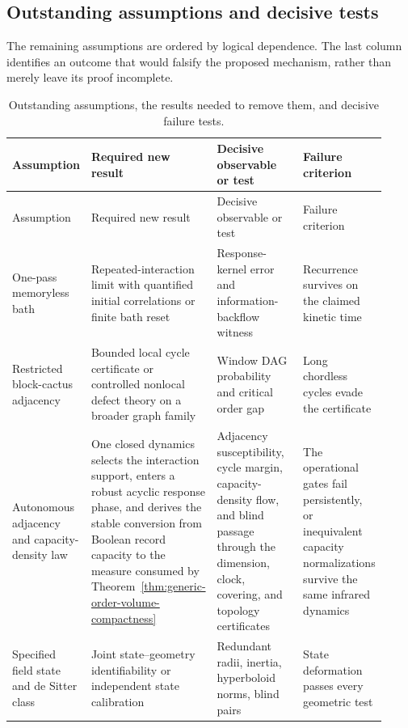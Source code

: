 \begin{landscape}
\section{Outstanding assumptions and decisive tests}
\label{sec:updated-ledger}

The remaining assumptions are ordered by logical dependence.  The last
column identifies an outcome that would falsify the proposed mechanism,
rather than merely leave its proof incomplete.

\small
\begin{longtable}{@{}P{0.17\linewidth}P{0.25\linewidth}
P{0.34\linewidth}P{0.16\linewidth}@{}}
\caption{Outstanding assumptions, the results needed to remove them, and
decisive failure tests.}
\label{tab:updated-assumption-ledger}\\
\toprule
Assumption & Required new result & Decisive observable or test & Failure
criterion\\
\midrule
\endfirsthead
\toprule
Assumption & Required new result & Decisive observable or test & Failure
criterion\\
\midrule
\endhead
One-pass memoryless bath
& Repeated-interaction limit with quantified initial correlations or finite
  bath reset
& Response-kernel error and information-backflow witness
& Recurrence survives on the claimed kinetic time\\
\addlinespace
Restricted block-cactus adjacency
& Bounded local cycle certificate or controlled nonlocal defect theory on a
  broader graph family
& Window DAG probability and critical order gap
& Long chordless cycles evade the certificate\\
\addlinespace
Autonomous adjacency and capacity-density law
& One closed dynamics selects the interaction support, enters a robust
  acyclic response phase, and derives the stable conversion from Boolean
  record capacity to the measure consumed by
  Theorem~\ref{thm:generic-order-volume-compactness}
& Adjacency susceptibility, cycle margin, capacity-density flow, and blind
  passage through the dimension, clock, covering, and topology certificates
& The operational gates fail persistently, or inequivalent capacity
  normalizations survive the same infrared dynamics\\
\addlinespace
Specified field state and de Sitter class
& Joint state--geometry identifiability or independent state calibration
& Redundant radii, inertia, hyperboloid norms, blind pairs
& State deformation passes every geometric test\\

\end{longtable}
\end{landscape}
